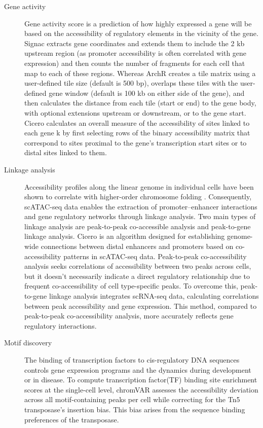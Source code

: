 \begin{description}
	\item[Gene activity] Gene activity score is a prediction of how highly expressed a gene will be based on the accessibility of regulatory elements in the vicinity of the gene. Signac\citep{signac} extracts gene coordinates and extends them to include the 2 kb upstream region (as promoter accessibility is often correlated with gene expression) and then counts the number of fragments for each cell that map to each of these regions. Whereas ArchR\citep{granja2019single} creates a tile matrix using a user-defined tile size (default is 500 bp), overlaps these tiles with the user-defined gene window (default is 100 kb on either side of the gene), and then calculates the distance from each tile (start or end) to the gene body, with optional extensions upstream or downstream, or to the gene start. Cicero\citep{pliner2018cicero} calculates an overall measure of the accessibility of sites linked to each gene k by first selecting rows of the binary accessibility matrix that correspond to sites proximal to the gene’s transcription start sites or to distal sites linked to them.
	\item[Linkage analysis]
	Accessibility profiles along the linear genome in individual cells have been shown to correlate with higher-order chromosome folding \citep{Buenrostro2015}. Consequently, scATAC-seq data enables the extraction of promoter–enhancer interactions and gene regulatory networks through linkage analysis. Two main types of linkage analysis are peak-to-peak co-accessible analysis and peak-to-gene linkage analysis. Cicero \citep{pliner2018cicero} is an algorithm designed for establishing genome-wide connections between distal enhancers and promoters based on co-accessibility patterns in scATAC-seq data. Peak-to-peak co-accessibility analysis seeks correlations of accessibility between two peaks across cells, but it doesn't necessarily indicate a direct regulatory relationship due to frequent co-accessibility of cell type-specific peaks. To overcome this, peak-to-gene linkage analysis integrates scRNA-seq data, calculating correlations between peak accessibility and gene expression\citep{Granja2021}. This method, compared to peak-to-peak co-accessibility analysis, more accurately reflects gene regulatory interactions\citep{shi2022scatacoverview}.
	\item[Motif discovery]
	The binding of transcription factors to cis-regulatory DNA sequences controls gene expression programs and the dynamics during development or in disease. To compute transcription factor(TF) binding site enrichment scores at the single-cell level, chromVAR\citep{schep2017chromvar} assesses the accessibility deviation across all motif-containing peaks per cell while correcting for the Tn5 transposase's insertion bias. This bias arises from the sequence binding preferences of the transposase. 

\end{description}

